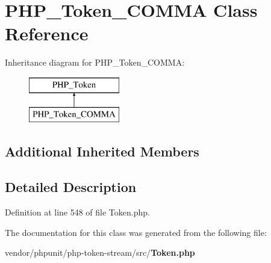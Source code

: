 \section{P\+H\+P\+\_\+\+Token\+\_\+\+C\+O\+M\+M\+A Class Reference}
\label{class_p_h_p___token___c_o_m_m_a}
Inheritance diagram for P\+H\+P\+\_\+\+Token\+\_\+\+C\+O\+M\+M\+A\+:\begin{figure}[H]
\begin{center}
\leavevmode
\includegraphics[height=2.000000cm]{class_p_h_p___token___c_o_m_m_a}
\end{center}
\end{figure}
\subsection*{Additional Inherited Members}


\subsection{Detailed Description}


Definition at line 548 of file Token.\+php.



The documentation for this class was generated from the following file\+:\begin{DoxyCompactItemize}
\item 
vendor/phpunit/php-\/token-\/stream/src/{\bf Token.\+php}\end{DoxyCompactItemize}
